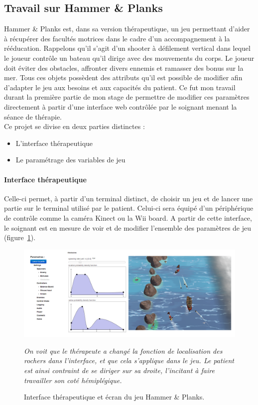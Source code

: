 \documentclass[french, 12pt]{article} %
\begin{document}
	\subsection{Travail sur Hammer \& Planks}
Hammer \& Planks est, dans sa version thérapeutique, un jeu permettant d'aider à récupérer des facultés motrices dans le cadre d'un accompagnement à la rééducation. Rappelons qu'il s'agit d'un shooter à défilement vertical dans lequel le joueur contrôle un bateau qu'il dirige avec des mouvements du corps. Le joueur doit éviter des obstacles, affronter divers ennemis et ramasser des bonus sur la mer. Tous ces objets possèdent des attributs qu'il est possible de modifier afin d'adapter le jeu aux besoins et aux capacités du patient. Ce fut mon travail durant la première partie de mon stage de permettre de modifier ces paramètres directement à partir d'une interface web contrôlée par le soignant menant la séance de thérapie. \\
Ce projet se divise en deux parties distinctes :
\begin{itemize}
\item L'interface thérapeutique
\item Le paramétrage des variables de jeu
\end{itemize}

\paragraph{Interface thérapeutique}
Celle-ci permet, à partir d'un terminal distinct, de choisir un jeu et de lancer une partie sur le terminal utilisé par le patient. Celui-ci sera équipé d'un périphérique de contrôle comme la caméra Kinect ou la Wii board. A partir de cette interface, le soignant est en mesure de voir et de modifier l'ensemble des paramètres de jeu (figure~\ref{comparatif}).

\begin{figure}[h]
\centering
\includegraphics[scale=0.4]{images/comparatif_interface_rochers.png}
\caption{Interface thérapeutique et écran du jeu Hammer \& Planks.}
\emph{On voit que le thérapeute a changé la fonction de localisation des rochers dans l'interface, et que cela s'applique dans le jeu. Le patient est ainsi contraint de se diriger sur sa droite, l'incitant à faire travailler son coté hémiplégique.}
	\label{comparatif}
\end{figure}
\end{document}
